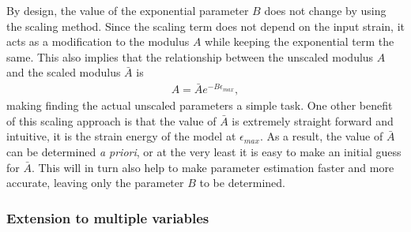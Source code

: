     By design, the value of the exponential parameter $B$ does not change by using the scaling method. Since the scaling term does not depend on the input strain, it acts as a modification to the modulus $A$ while keeping the exponential term the same. This also implies that the relationship between the unscaled modulus $A$ and the scaled modulus $\bar{A}$ is
\begin{equation}
\begin{aligned}
A = \bar{A} e^{-B\epsilon_{max}},
\end{aligned}
\end{equation}
making finding the actual unscaled parameters a simple task. One other benefit of this scaling approach is that the value of $\bar{A}$ is extremely straight forward and intuitive, it is the strain energy of the model at $\epsilon_{max}$. As a result, the value of $\bar{A}$ can be determined \textit{a priori}, or at the very least it is easy to make an initial guess for $\bar{A}$. This will in turn also help to make parameter estimation faster and more accurate, leaving only the parameter $B$ to be determined. 


\subsubsection{Extension to multiple variables}

